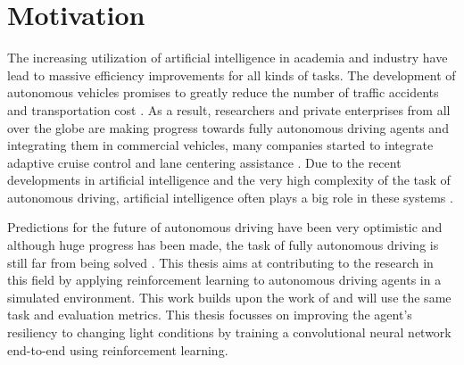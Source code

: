 \chapter{Motivation}
\label{cha:Motivation}

The increasing utilization of artificial intelligence in academia and industry have lead to massive efficiency improvements for all kinds of tasks. The development of autonomous vehicles promises to greatly reduce the number of traffic accidents and transportation cost \autocite{mckinsey}. As a result, researchers and private enterprises from all over the globe are making progress towards fully autonomous driving agents and integrating them in commercial vehicles, many companies started to integrate adaptive cruise control and lane centering assistance \autocite{carreviews}. Due to the recent developments in artificial intelligence and the very high complexity of the task of autonomous driving, artificial intelligence often plays a big role in these systems \autocite{drl_for_ad}.


Predictions for the future of autonomous driving have been very optimistic and although huge progress has been made, the task of fully autonomous driving is still far from being solved \autocite{state_of_autonomous_driving2023}. This thesis aims at contributing to the research in this field by applying reinforcement learning to autonomous driving agents in a simulated environment. This work builds upon the work of \autocite{maximilian} and will use the same task and evaluation metrics. This thesis focusses on improving the agent's resiliency to changing light conditions by training a convolutional neural network end-to-end using reinforcement learning.